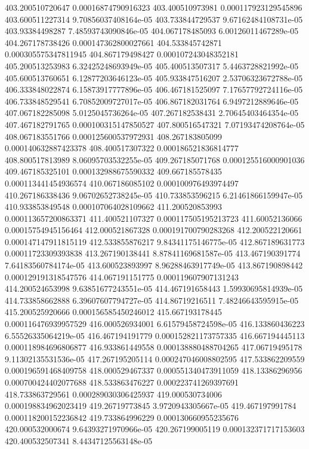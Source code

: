 {403.200510720647 0.00016874790916323
403.400510973981 0.000117923129545896
403.600511227314 9.70856037408164e-05
403.733844729537 9.67162484108731e-05
403.93384498287 7.48593743090846e-05
404.067178485093 6.00126011467289e-05
404.267178738426 0.000147362800027661
404.533845742871 0.000305575347811945
404.867179498427 0.000107243048352181
405.200513253983 6.32425248693949e-05
405.400513507317 5.4463728821992e-05
405.600513760651 6.12877203646123e-05
405.933847516207 2.53706323672788e-05
406.333848022874 6.15873917777896e-05
406.467181525097 7.17657792724116e-05
406.733848529541 6.70852009727017e-05
406.867182031764 6.9497212889646e-05
407.067182285098 5.0125045736264e-05
407.267182538431 2.70645403464354e-05
407.467182791765 0.000100315147850527
407.800516547321 7.07193474208764e-05
408.067183551766 0.000125600537972931
408.267183805099 0.000140632887423378
408.400517307322 0.000186521836814777
408.800517813989 8.06095703532255e-05
409.267185071768 0.000125516000901036
409.467185325101 0.000132988675590332
409.667185578435 0.000113441454936574
410.067186085102 0.000100976493974497
410.267186338436 9.06702652738245e-05
410.733853596215 6.21461866159947e-05
410.933853849548 0.000107064028109662
411.200520853993 0.000113657200863371
411.400521107327 0.000117505195213723
411.60052136066 0.00015754945156464
412.000521867328 0.000191700790283268
412.200522120661 0.000147147911815119
412.533855876217 9.84341175146775e-05
412.867189631773 0.00011723309393838
413.267190138441 8.87841169681587e-05
413.467190391774 7.64183560784174e-05
413.600523893997 8.96288463917749e-05
413.867190898442 0.000129191318547576
414.067191151775 0.000119607907131243
414.200524653998 9.63851677243551e-05
414.467191658443 1.59930695814939e-05
414.733858662888 6.39607607794727e-05
414.86719216511 7.48246643595915e-05
415.200525920666 0.000156585450246012
415.667193178445 0.000116476939957529
416.000526934001 6.61579458724598e-05
416.133860436223 6.55526335064219e-05
416.467194191779 0.000152821173757335
416.667194445113 0.000118984696806877
416.933861449558 0.000138880488704265
417.06719495178 9.11302135531536e-05
417.267195205114 0.000247046008802595
417.533862209559 0.000196591468409758
418.000529467337 0.000551340473911059
418.13386296956 0.000700424402077688
418.533863476227 0.000223741269397691
418.733863729561 0.000289030306425937
419.000530734006 0.000198834962023419
419.26719773845 3.9720943305667e-05
419.467197991784 0.000118200152236842
419.733864996229 0.000130660955235676
420.000532000674 9.64393271970966e-05
420.267199005119 0.000132371717153603
420.400532507341 8.44347125563148e-05
}
